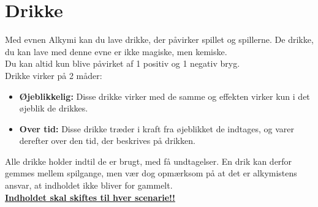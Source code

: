 \chapter{Drikke}

Med evnen Alkymi kan du lave drikke, der påvirker spillet og spillerne. De drikke, du kan lave med denne evne er ikke magiske, men kemiske.\\
Du kan altid kun blive påvirket af 1 positiv og 1 negativ bryg.\\
Drikke virker på 2 måder:
\begin{itemize}
    \item \textbf{Øjeblikkelig:} Disse drikke virker med de samme og effekten virker kun i det øjeblik de drikkes.
    \item \textbf{Over tid:} Disse drikke træder i kraft fra øjeblikket de indtages, og varer derefter over den tid, der beskrives på drikken.
\end{itemize}

Alle drikke holder indtil de er brugt, med få undtagelser. En drik kan derfor gemmes mellem spilgange, men vær dog opmærksom på at det er alkymistens ansvar, at indholdet ikke bliver for gammelt.\\
\textbf{\underline{Indholdet skal skiftes til hver scenarie!!}}

